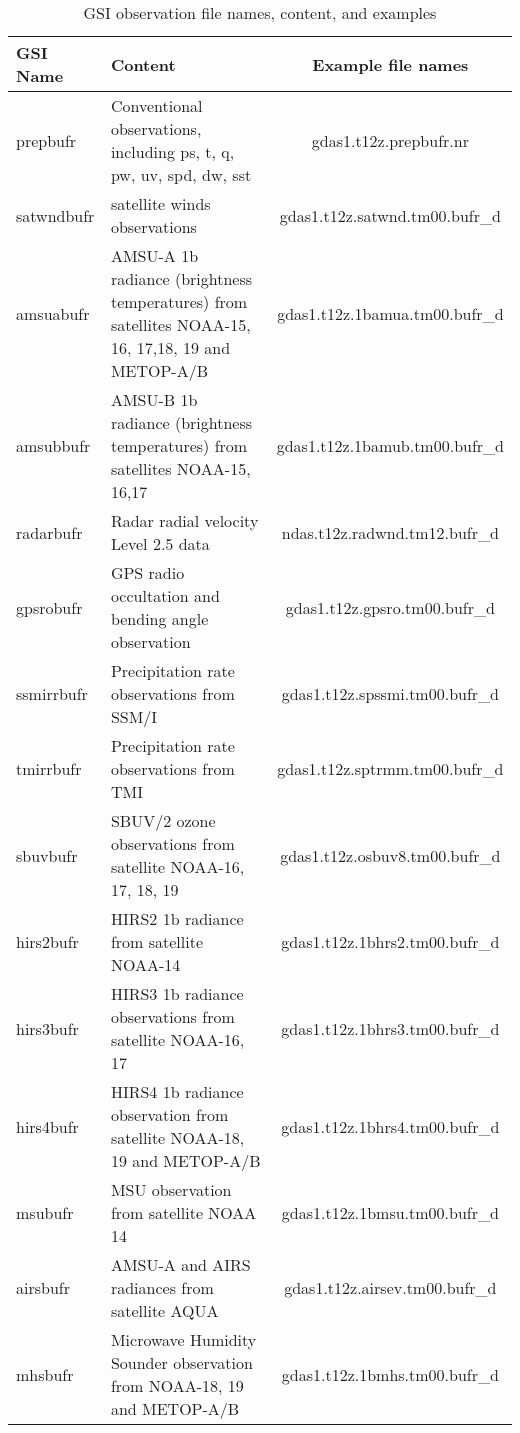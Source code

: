 \begin{table}[htbp]
\centering
\begin{footnotesize}
\caption{GSI observation file names, content, and examples}
\begin{tabular}{|l|p{7cm}|c|}
\hline
\hline
GSI Name  & Content & Example file names \\
\hline
\hline
prepbufr & Conventional observations, including ps, t, q, pw, uv, spd, dw, sst & gdas1.t12z.prepbufr.nr \\
\hline
satwndbufr & satellite winds observations &	gdas1.t12z.satwnd.tm00.bufr\_d \\
\hline
amsuabufr &	AMSU-A 1b radiance (brightness temperatures) from satellites
 NOAA-15, 16, 17,18, 19 and METOP-A/B &	gdas1.t12z.1bamua.tm00.bufr\_d \\
\hline
amsubbufr &	AMSU-B 1b radiance (brightness temperatures) from satellites NOAA-15, 16,17 &	gdas1.t12z.1bamub.tm00.bufr\_d \\
\hline
radarbufr &	Radar radial velocity Level 2.5 data &	ndas.t12z.radwnd.tm12.bufr\_d \\
\hline
gpsrobufr &	GPS radio occultation and bending angle observation & gdas1.t12z.gpsro.tm00.bufr\_d \\
\hline
ssmirrbufr & Precipitation rate observations from SSM/I & gdas1.t12z.spssmi.tm00.bufr\_d \\
\hline
tmirrbufr &	Precipitation rate observations from TMI & 	gdas1.t12z.sptrmm.tm00.bufr\_d \\
\hline
sbuvbufr &	SBUV/2 ozone observations from satellite NOAA-16, 17, 18, 19 &	gdas1.t12z.osbuv8.tm00.bufr\_d \\
\hline
hirs2bufr &	HIRS2 1b radiance from satellite NOAA-14 &	gdas1.t12z.1bhrs2.tm00.bufr\_d \\
\hline
hirs3bufr &	HIRS3 1b radiance observations from satellite NOAA-16, 17 &	gdas1.t12z.1bhrs3.tm00.bufr\_d \\
\hline
hirs4bufr &	HIRS4 1b radiance observation from satellite NOAA-18, 19 and METOP-A/B &	gdas1.t12z.1bhrs4.tm00.bufr\_d \\
\hline
msubufr	& MSU observation from satellite NOAA 14  &	gdas1.t12z.1bmsu.tm00.bufr\_d \\
\hline
airsbufr &	AMSU-A and AIRS radiances from satellite AQUA &	gdas1.t12z.airsev.tm00.bufr\_d \\
\hline
mhsbufr	& Microwave Humidity Sounder observation from NOAA-18, 19 and METOP-A/B &	gdas1.t12z.1bmhs.tm00.bufr\_d \\

\end{tabular}
\end{footnotesize}
\end{table}
